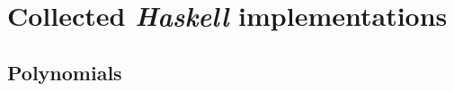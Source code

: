 \section{Collected \emph{Haskell} implementations}

\subsection{Polynomials} \label{app:polynomials}


